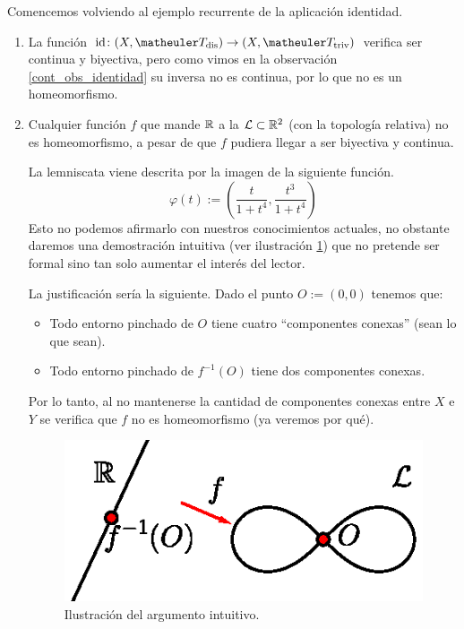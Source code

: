 \begin{exa}[Homeomorfismos]\label{etop_exa_homeomorfismos} Comencemos volviendo al ejemplo recurrente de la aplicación identidad.
	\begin{enumerate}
		\item La función $\text{id}\colon(X,\T_{\text{dis}})\rightarrow(X,\T_\text{triv})$ verifica ser continua y biyectiva, pero como vimos en la observación \ref{cont_obs_identidad} su inversa no es continua, por lo que no es un homeomorfismo. 
		
		\item Cualquier función $f$ que mande $\mathbb{R}$ a la  $\mathcal{L}\subset\mathbb{R}^2$ (con la topología relativa) no es homeomorfismo, a pesar de que $f$ pudiera llegar a ser biyectiva y continua.
		
		La lemniscata viene descrita por la imagen de la siguiente función.
		\[\varphi(t):=\left(\frac{t}{1+t^4},\frac{t^3}{1+t^4}\right)\]
		Esto no podemos afirmarlo con nuestros conocimientos actuales, no obstante daremos una demostración intuitiva (ver ilustración \ref{cont_img_lemins}) que no pretende ser formal sino tan solo aumentar el interés del lector.
		
		La justificación sería la siguiente. Dado el punto $O:=(0,0)$ tenemos que:
		\begin{itemize}
			\item Todo entorno pinchado de $O$ tiene cuatro ``componentes conexas'' (sean lo que sean).
			\item Todo entorno pinchado de $f^{-1}(O)$ tiene dos componentes conexas.
		\end{itemize}
		
		Por lo tanto, al no mantenerse la cantidad de componentes conexas entre $X$ e $Y$ se verifica que $f$ no es homeomorfismo (ya veremos por qué).
		\begin{figure}[h!]
			\centering
			\includegraphics[scale = 0.75]{img/lemniscata}
			\caption{Ilustración del argumento intuitivo.}
			\label{cont_img_lemins}
		\end{figure}
		

\end{enumerate}
\end{exa}
